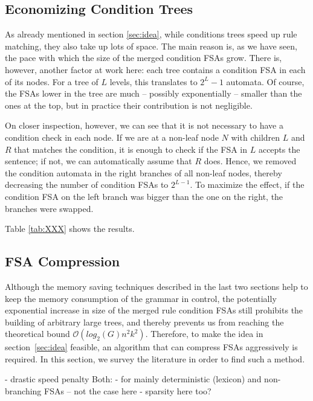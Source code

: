 \documentclass{article}
\begin{document}
\subsection{Economizing Condition Trees}

As already mentioned in section \ref{sec:idea}, while conditions trees speed up
rule matching, they also take up lots of space. The main reason is, as we have
seen, the pace with which the size of the merged condition FSAs grow. There is,
however, another factor at work here: each tree contains a condition FSA in each
of its nodes. For a tree of $L$ levels, this translates to $2^L - 1$ automata.
Of course, the FSAs lower in the tree are much -- possibly exponentially --
smaller than the ones at the top, but in practice their contribution is not
negligible.

On closer inspection, however, we can see that it is not necessary to have a
condition check in each node. If we are at a non-leaf node $N$ with children
$L$ and $R$ that matches the condition, it is enough to check if the FSA in
$L$ accepts the sentence; if not, we can automatically assume that $R$ does.
Hence, we removed the condition automata in the right branches of all non-leaf
nodes, thereby decreasing the number of condition FSAs to $2^{L-1}$. To maximize
the effect, if the condition FSA on the left branch was bigger than the one on
the right, the branches were swapped.

Table \ref{tab:XXX} shows the results.

\subsection{FSA Compression}

Although the memory saving techniques described in the last two sections help to
keep the memory consumption of the grammar in control, the potentially
exponential increase in size of the merged rule condition FSAs still prohibits
the building of arbitrary large trees, and thereby prevents us from reaching
the theoretical bound $\mathcal{O}(log_2(G)n^2k^2)$. Therefore, to make the idea
in section~\ref{sec:idea} feasible, an algorithm that can compress FSAs
aggressively is required. %
In this section, we survey the literature in order to find such a method.

- drastic speed penalty
Both:
- for mainly deterministic (lexicon) and non-branching FSAs -- not the case here
- sparsity here too?
\end{document}

